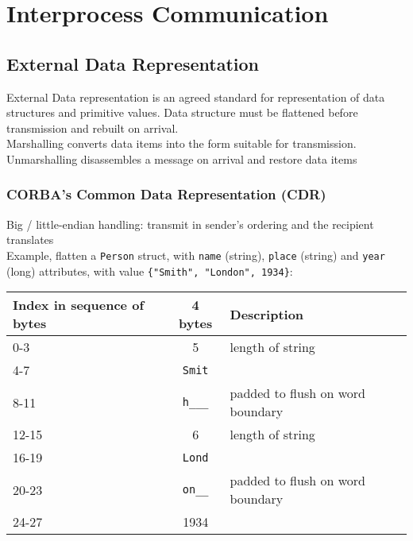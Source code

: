\chapter{Interprocess Communication}

\begin{multicols*}{2}
\section{External Data Representation}

\noindent External Data representation is an agreed standard for representation of data structures and primitive values. Data structure must be flattened before transmission and rebuilt on arrival. \\

\noindent Marshalling converts data items into the form suitable for transmission. Unmarshalling disassembles a message on arrival and restore data items

\subsection{CORBA’s Common Data Representation (CDR)}

\noindent Big / little-endian handling: transmit in sender’s ordering and the recipient translates\\

\noindent Example, flatten a \verb|Person| struct, with \verb|name| (string), \verb|place| (string) and \verb|year| (long) attributes, with value \verb|{"Smith", "London", 1934}|:\\

\begin{center}
\begin{tabular}{ |m{2cm}|c|p{4cm}| } 
    \hline
    Index in sequence of bytes & 4 bytes & Description \\
    \hline 
    0-3   & 5           & length of string \\
    4-7   & \verb|Smit| & \\
    8-11  & \verb|h___| & padded to flush on word boundary \\
    12-15 & 6           & length of string \\
    16-19 & \verb|Lond| & \\
    20-23 & \verb|on__| & padded to flush on word boundary \\
    24-27 & 1934        & \\
    \hline
\end{tabular}
\end{center}


\end{multicols*}
